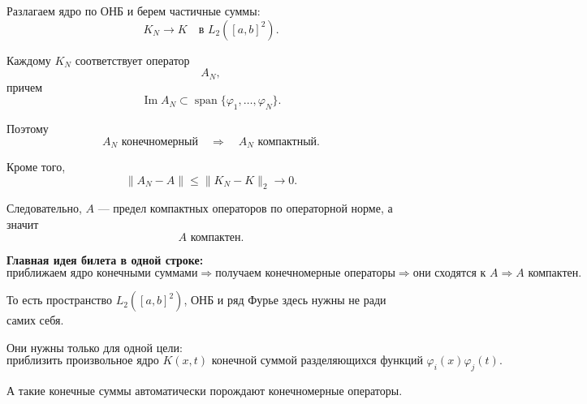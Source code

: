 \begin{idea}
	Разлагаем ядро по ОНБ и берем частичные суммы:
	\[
	K_N\to K
	\quad\text{в }L_2([a,b]^2).
	\]
	
	Каждому \(K_N\) соответствует оператор
	\[
	A_N,
	\]
	причем
	\[
	\operatorname{Im}A_N
	\subset
	\operatorname{span}\{\varphi_1,\ldots,\varphi_N\}.
	\]
	
	Поэтому
	\[
	A_N
	\text{ конечномерный}
	\quad\Longrightarrow\quad
	A_N
	\text{ компактный}.
	\]
	
	Кроме того,
	\[
	\|A_N-A\|
	\leq
	\|K_N-K\|_2
	\to0.
	\]
	
	Следовательно, \(A\) --- предел компактных операторов
	по операторной норме, а значит
	\[
	\boxed{A\text{ компактен}.}
	\]
	
	\medskip
	
	\textbf{Главная идея билета в одной строке:}
	\[
	\boxed{
		\text{приближаем ядро конечными суммами}
		\Rightarrow
		\text{получаем конечномерные операторы}
		\Rightarrow
		\text{они сходятся к }A
		\Rightarrow
		A\text{ компактен}.
	}
	\]
	
	То есть пространство \(L_2([a,b]^2)\), ОНБ и ряд Фурье здесь нужны
	не ради самих себя.
	
	Они нужны только для одной цели:
	\[
	\boxed{
		\text{приблизить произвольное ядро }K(x,t)
		\text{ конечной суммой разделяющихся функций }
		\varphi_i(x)\varphi_j(t).
	}
	\]
	
	А такие конечные суммы автоматически порождают конечномерные операторы.
\end{idea}